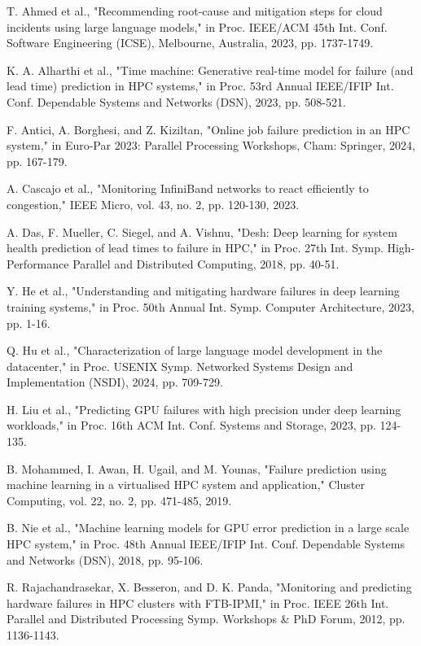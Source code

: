 \documentclass[conference]{IEEEtran}
\begin{document}
\begin{thebibliography}{00}
 T. Ahmed et al., "Recommending root-cause and mitigation steps for cloud incidents using large language models," in Proc. IEEE/ACM 45th Int. Conf. Software Engineering (ICSE), Melbourne, Australia, 2023, pp. 1737-1749.

 K. A. Alharthi et al., "Time machine: Generative real-time model for failure (and lead time) prediction in HPC systems," in Proc. 53rd Annual IEEE/IFIP Int. Conf. Dependable Systems and Networks (DSN), 2023, pp. 508-521.

 F. Antici, A. Borghesi, and Z. Kiziltan, "Online job failure prediction in an HPC system," in Euro-Par 2023: Parallel Processing Workshops, Cham: Springer, 2024, pp. 167-179.

 A. Cascajo et al., "Monitoring InfiniBand networks to react efficiently to congestion," IEEE Micro, vol. 43, no. 2, pp. 120-130, 2023.

 A. Das, F. Mueller, C. Siegel, and A. Vishnu, "Desh: Deep learning for system health prediction of lead times to failure in HPC," in Proc. 27th Int. Symp. High-Performance Parallel and Distributed Computing, 2018, pp. 40-51.

 Y. He et al., "Understanding and mitigating hardware failures in deep learning training systems," in Proc. 50th Annual Int. Symp. Computer Architecture, 2023, pp. 1-16.

 Q. Hu et al., "Characterization of large language model development in the datacenter," in Proc. USENIX Symp. Networked Systems Design and Implementation (NSDI), 2024, pp. 709-729.

 H. Liu et al., "Predicting GPU failures with high precision under deep learning workloads," in Proc. 16th ACM Int. Conf. Systems and Storage, 2023, pp. 124-135.

 B. Mohammed, I. Awan, H. Ugail, and M. Younas, "Failure prediction using machine learning in a virtualised HPC system and application," Cluster Computing, vol. 22, no. 2, pp. 471-485, 2019.

 B. Nie et al., "Machine learning models for GPU error prediction in a large scale HPC system," in Proc. 48th Annual IEEE/IFIP Int. Conf. Dependable Systems and Networks (DSN), 2018, pp. 95-106.

 R. Rajachandrasekar, X. Besseron, and D. K. Panda, "Monitoring and predicting hardware failures in HPC clusters with FTB-IPMI," in Proc. IEEE 26th Int. Parallel and Distributed Processing Symp. Workshops \& PhD Forum, 2012, pp. 1136-1143.


\end{thebibliography}
\end{document}
